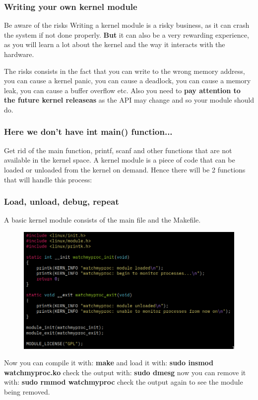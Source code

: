 \documentclass{beamer}
\begin{document}
\begin{frame}
    \frametitle{Writing your own kernel module}
    \begin{alertblock}{Be aware of the risks}
        \small
        Writing a kernel module is a risky business, as it can crash the system
        if not done properly. \newline
        \newline
        \textbf{But} it can also be a very rewarding experience, as you will
        learn a lot about the kernel and the way it interacts with the hardware.
    \end{alertblock}
    \small
    The risks consists in the fact that you can write to the wrong memory
    address, you can cause a kernel panic, you can cause a deadlock, you can
    cause a memory leak, you can cause a buffer overflow etc.
    \newline
    Also you need to \textbf{pay attention to the future kernel releaseas} as
    the API may change and so your module should do.

\end{frame}

\begin{frame}
    \frametitle{Here we don't have int main() function...}
    \small
    Get rid of the main function, printf, scanf and other functions that are
    not available in the kernel space. \newline \newline
    A kernel module is a piece of code that can be loaded or unloaded
    from the kernel on demand. Hence there will be 2 functions that will
    handle this process: \newline
\end{frame}

\begin{frame}
    \frametitle{Load, unload, debug, repeat}
    \footnotesize
    A basic kernel module consists of the main file and the Makefile.
    \begin{figure}
        \includegraphics[width=0.7\linewidth] {simplekernel}
        \label{fig:simplekernel}
    \end{figure}
    Now you can compile it with:
    \textbf{make}
    \newline
    and load it with:
    \textbf{sudo insmod watchmyproc.ko}
    \newline
    check the output with:
    \textbf{sudo dmesg}
    \newline
    now you can remove it with:
    \textbf{sudo rmmod watchmyproc}
    \newline
    check the output again to see the module being removed.

\end{frame}
\end{document}
